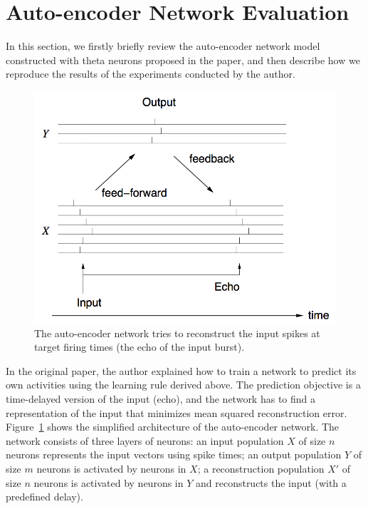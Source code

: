 \section{Auto-encoder Network Evaluation}
\label{exp}

In this section, we firstly briefly review the auto-encoder network model constructed with theta neurons
proposed in the paper, and then describe how we reproduce the results of the experiments conducted by the author.

\begin{figure}
\centering
\includegraphics[width=0.98\columnwidth]{network}
\caption{The auto-encoder network tries to reconstruct the input spikes at target firing times (the echo of the input burst).
}
\label{auto_encoder}
\end{figure}

In the original paper, the author explained how to train a network to predict its own activities using the learning rule derived above. 
The prediction objective is a time-delayed version of the input (echo), 
and the network has to find a representation of the input that minimizes mean squared reconstruction error.
Figure~\ref{auto_encoder} shows the simplified architecture of the auto-encoder network.
The network consists of three layers of neurons: 
an input population $X$ of size $n$ neurons represents the input vectors using spike times; 
an output population $Y$ of size $m$ neurons is activated by neurons in $X$; 
a reconstruction population $X'$ of size $n$ neurons is activated by neurons in $Y$ and reconstructs the input (with a predefined delay).

